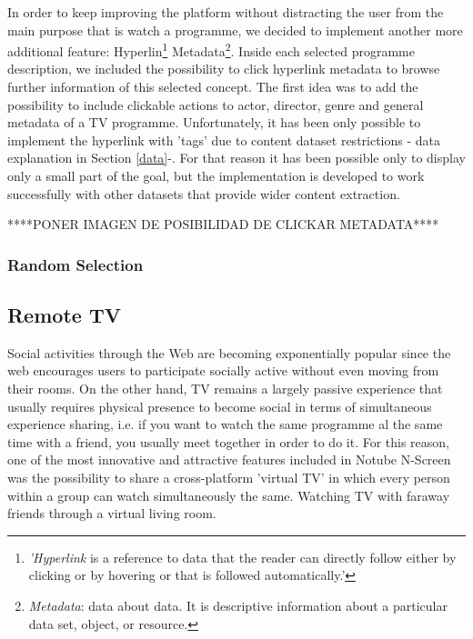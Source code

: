 \documentclass{acm_proc_article-sp}
\begin{document}
In order to keep improving the platform without distracting the user from the main purpose\cite{allen2012smashing} that is watch a programme, we decided to implement another more additional feature: Hyperlin\cite{wiki:hyper}\footnote{\textit{'Hyperlink} is a reference to data that the reader can directly follow either by clicking or by hovering or that is followed automatically.'} Metadata\footnote{\textit{Metadata}: data about data. It is descriptive information about a particular data set, object, or resource.}. Inside each selected programme description, we included the possibility to click hyperlink metadata to browse further information of this selected concept. The first idea was to add the possibility to include clickable actions to actor, director, genre and general metadata of a TV programme. Unfortunately, it has been only possible to implement the hyperlink with 'tags'  due to content dataset restrictions - data explanation in Section \ref{data}-. For that reason it has been possible only to display only a small part of the goal, but the implementation is developed to work successfully with other datasets that provide wider content extraction.

****PONER IMAGEN DE POSIBILIDAD DE CLICKAR METADATA****

\subsubsection{Random Selection}

\subsection{Remote TV}

Social activities through the Web are becoming exponentially popular since the web encourages users to  participate socially active without even moving from their rooms\cite{schopman2010notube}. On the other hand, TV remains a largely passive experience that usually requires physical presence to become social in terms of simultaneous experience sharing, i.e. if you want to watch the same programme al the same time with a friend, you usually meet together in order to do it. For this reason, one of the most innovative and attractive features included in Notube N-Screen was the possibility to share a cross-platform 'virtual TV' in which every person within a group can watch simultaneously the same. Watching TV with faraway friends through a virtual living room.
\end{document}
